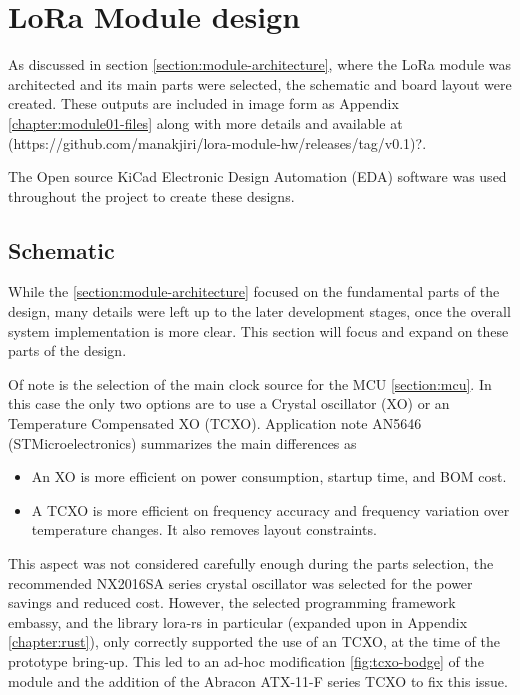 
\section{LoRa Module design}
As discussed in section \ref{section:module-architecture}, where the LoRa module was architected and its main parts were selected, the schematic and board layout were created. These outputs are included in image form as Appendix \ref{chapter:module01-files} along with more details and available at (https://github.com/manakjiri/lora-module-hw/releases/tag/v0.1)?.

The Open source KiCad Electronic Design Automation (EDA) software was used throughout the project to create these designs. 

\subsection{Schematic}
While the \ref{section:module-architecture} focused on the fundamental parts of the design, many details were left up to the later development stages, once the overall system implementation is more clear. This section will focus and expand on these parts of the design.

Of note is the selection of the main clock source for the MCU \ref{section:mcu}. In this case the only two options are to use a Crystal oscillator (XO) or an Temperature Compensated XO (TCXO). Application note AN5646 (STMicroelectronics) summarizes the main differences as
\begin{itemize}
    \item An XO is more efficient on power consumption, startup time, and BOM cost.
    \item A TCXO is more efficient on frequency accuracy and frequency variation over temperature changes. It also
    removes layout constraints.
\end{itemize}

This aspect was not considered carefully enough during the parts selection, the recommended NX2016SA series crystal oscillator was selected for the power savings and reduced cost. However, the selected programming framework embassy, and the library lora-rs in particular (expanded upon in Appendix \ref{chapter:rust}), only correctly supported the use of an TCXO, at the time of the prototype bring-up. This led to an ad-hoc modification \ref{fig:tcxo-bodge} of the module and the addition of the Abracon ATX-11-F series TCXO to fix this issue.


